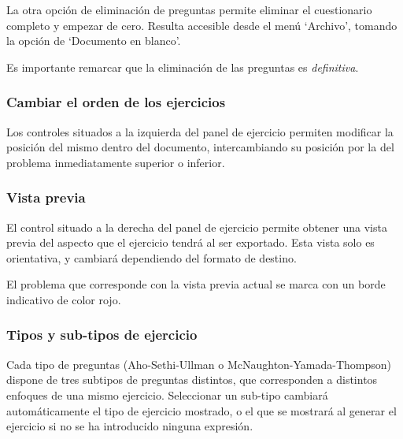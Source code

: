 
La otra opción de eliminación de preguntas permite eliminar el cuestionario completo y empezar de cero.
Resulta accesible desde el menú `Archivo', tomando la opción de `Documento en blanco'.


Es importante remarcar que la eliminación de las preguntas es \emph{definitiva}.

\subsubsection{Cambiar el orden de los ejercicios}

Los controles situados a la izquierda del panel de ejercicio permiten modificar la posición del mismo dentro del documento, intercambiando su posición por la del problema inmediatamente superior o inferior.


\subsubsection{Vista previa}

El control situado a la derecha del panel de ejercicio permite obtener una vista previa del aspecto que el ejercicio tendrá al ser exportado.
Esta vista solo es orientativa, y cambiará dependiendo del formato de destino.


El problema que corresponde con la vista previa actual se marca con un borde indicativo de color rojo.

\subsubsection{Tipos y sub-tipos de ejercicio}

Cada tipo de preguntas (Aho-Sethi-Ullman o McNaughton-Yamada-Thompson) dispone de tres subtipos de preguntas distintos, que corresponden a distintos enfoques de una mismo ejercicio.
Seleccionar un sub-tipo cambiará automáticamente el tipo de ejercicio mostrado, o el que se mostrará al generar el ejercicio si no se ha introducido ninguna expresión.


